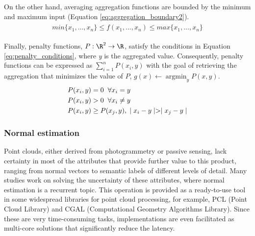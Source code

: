On the other hand, averaging aggregation functions are bounded by the minimum and maximum input (Equation \ref{eq:aggregation_boundary2}).
\begin{gather}
    \label{eq:aggregation_boundary2}
    \begin{aligned}
        \textit{min}\{x_1,...,x_n\} \leq f(x_1,...,x_n) \leq \textit{max}\{x_1,...,x_n\}
    \end{aligned}
\end{gather}

Finally, penalty functions, $P: \R^{2} \rightarrow \R$, satisfy the conditions in Equation \ref{eq:penalty_conditions}, where \textit{y} is the aggregated value. Consequently, penalty functions can be expressed as $\sum_{i=1}^{n} P(x_i, y)$ with the goal of retrieving the aggregation that minimizes the value of $P$, $g(x) \gets \operatorname*{argmin}_y P(x, y)$.
\begin{gather}
    \label{eq:penalty_conditions}
    \begin{aligned}
        &P(x_i,y) = 0 \hspace{2mm} \forall x_i = y\\
        &P(x_i,y) > 0 \hspace{2mm} \forall x_i \neq y\\
        &P(x_i,y) \ge P(x_j,y), \hspace{1mm}\mid x_i - y \mid > \mid x_j - y \mid\\
    \end{aligned}
\end{gather}

\subsubsection{Normal estimation}

Point clouds, either derived from photogrammetry or passive sensing, lack certainty in most of the attributes that provide further value to this product, ranging from normal vectors to semantic labels of different levels of detail. Many studies work on solving the uncertainty of these attributes, where normal estimation is a recurrent topic. This operation is provided as a ready-to-use tool in some widespread libraries for point cloud processing, for example, PCL (Point Cloud Library) and CGAL (Computational Geometry Algorithms Library). Since these are very time-consuming tasks, implementations are even facilitated as multi-core solutions that significantly reduce the latency. 

